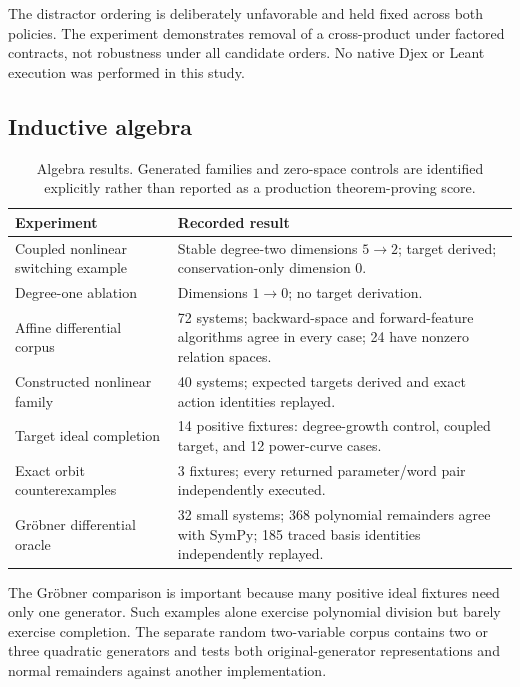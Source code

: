 The distractor ordering is deliberately unfavorable and held fixed across both
policies. The experiment demonstrates removal of a cross-product under factored
contracts, not robustness under all candidate orders. No native Djex or Leant
execution was performed in this study.

\subsection{Inductive algebra}

\begin{table}[ht]
\small
\begin{tabularx}{\textwidth}{@{}p{}Y@{}}
\toprule
Experiment & Recorded result \\
\midrule
Coupled nonlinear switching example & Stable degree-two dimensions $5\to2$; target derived; conservation-only dimension $0$. \\
Degree-one ablation & Dimensions $1\to0$; no target derivation. \\
Affine differential corpus & 72 systems; backward-space and forward-feature algorithms agree in every case; 24 have nonzero relation spaces. \\
Constructed nonlinear family & 40 systems; expected targets derived and exact action identities replayed. \\
Target ideal completion & 14 positive fixtures: degree-growth control, coupled target, and 12 power-curve cases. \\
Exact orbit counterexamples & 3 fixtures; every returned parameter/word pair independently executed. \\
Gr\"obner differential oracle & 32 small systems; 368 polynomial remainders agree with SymPy; 185 traced basis identities independently replayed. \\
\bottomrule
\end{tabularx}
\caption{Algebra results. Generated families and zero-space controls are identified explicitly rather than reported as a production theorem-proving score.}
\end{table}

The Gr\"obner comparison is important because many positive ideal fixtures need
only one generator. Such examples alone exercise polynomial division but barely
exercise completion. The separate random two-variable corpus contains two or
three quadratic generators and tests both original-generator representations and
normal remainders against another implementation.

